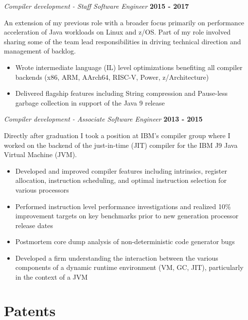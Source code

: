 \documentclass[margin,line]{res}
\begin{document}
\begin{resume}
\newpage

{\em Compiler development - Staff Software Engineer} \hfill {\bf 2015 - 2017}
\vspace{-.12in}

An extension of my previous role with a broader focus primarily on performance acceleration of Java workloads on Linux
and z/OS. Part of my role involved sharing some of the team lead responsibilities in driving technical direction and
management of backlog.

\vspace{.10in}

\begin{itemize}
\item Wrote intermediate language (IL) level optimizations benefiting all compiler backends (x86, ARM, AArch64, RISC-V,
Power, z/Architecture)
\item Delivered flagship features including String compression and Pause-less garbage collection in support of the Java
9 release
\end{itemize}

{\em Compiler development - Associate Software Engineer} \hfill {\bf 2013 - 2015}
\vspace{-.12in}

Directly after graduation I took a position at IBM's compiler group where I worked on the backend of the just-in-time
(JIT) compiler for the IBM J9 Java Virtual Machine (JVM).

\vspace{.10in}

\begin{itemize}
\item Developed and improved compiler features including intrinsics, register allocation, instruction scheduling, 
and optimal instruction selection for various processors
\item Performed instruction level performance investigations and realized 10\% improvement targets on key benchmarks
prior to new generation processor release dates
\item Postmortem core dump analysis of non-deterministic code generator bugs
\item Developed a firm understanding the interaction between the various components of a dynamic runtime environment 
(VM, GC, JIT), particularly in the context of a JVM
\end{itemize}

\section{\sc Patents}


\end{resume}
\end{document}

